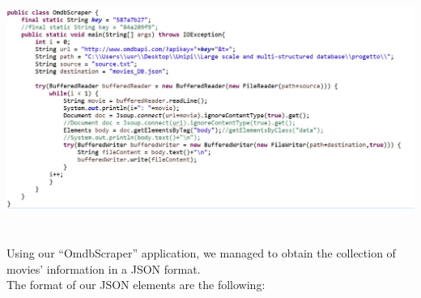 \documentclass[a4paper, oneside]{article}
\begin{document}
\begin{minipage}{\linewidth}
\begin{center}
\vspace{1mm}
\includegraphics[height = 80mm]{./images/screens/OMDBScraperScreen.jpg} 
\vspace{6mm}
\label{fig:OMDBScraper}
\vspace{4mm}
\end{center}
\end{minipage}
Using our “OmdbScraper” application, we managed to obtain the collection of movies’ information in a JSON format.\\ The format of our JSON elements are the following:\\
\end{document}
